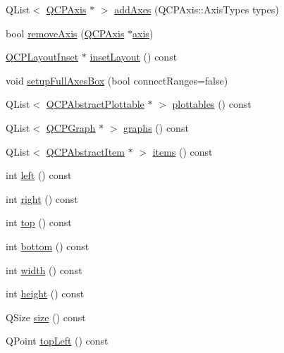 \begin{DoxyCompactItemize}
\item 
Q\+List$<$ \hyperlink{class_q_c_p_axis}{Q\+C\+P\+Axis} $\ast$ $>$ \hyperlink{class_q_c_p_axis_rect_a792e1f3d9cb1591fca135bb0de9b81fc}{add\+Axes} (Q\+C\+P\+Axis\+::\+Axis\+Types types)
\item 
bool \hyperlink{class_q_c_p_axis_rect_a03c39cd9704f0d36fb6cf980cdddcbaa}{remove\+Axis} (\hyperlink{class_q_c_p_axis}{Q\+C\+P\+Axis} $\ast$\hyperlink{class_q_c_p_axis_rect_a560de44e47a4af0f86c59102a094b1e4}{axis})
\item 
\hyperlink{class_q_c_p_layout_inset}{Q\+C\+P\+Layout\+Inset} $\ast$ \hyperlink{class_q_c_p_axis_rect_a4114887c7141b59650b7488f930993e5}{inset\+Layout} () const 
\item 
void \hyperlink{class_q_c_p_axis_rect_a5fa906175447b14206954f77fc7f1ef4}{setup\+Full\+Axes\+Box} (bool connect\+Ranges=false)
\item 
Q\+List$<$ \hyperlink{class_q_c_p_abstract_plottable}{Q\+C\+P\+Abstract\+Plottable} $\ast$ $>$ \hyperlink{class_q_c_p_axis_rect_a5b0d629c8de5572945eeae79a142296e}{plottables} () const 
\item 
Q\+List$<$ \hyperlink{class_q_c_p_graph}{Q\+C\+P\+Graph} $\ast$ $>$ \hyperlink{class_q_c_p_axis_rect_afa4ff90901d9275f670e24b40e3c1b25}{graphs} () const 
\item 
Q\+List$<$ \hyperlink{class_q_c_p_abstract_item}{Q\+C\+P\+Abstract\+Item} $\ast$ $>$ \hyperlink{class_q_c_p_axis_rect_a0f17ed539962cfcbaca8ce0b1776c840}{items} () const 
\item 
int \hyperlink{class_q_c_p_axis_rect_a55b3ecf72a3a65b053f7651b88db458d}{left} () const 
\item 
int \hyperlink{class_q_c_p_axis_rect_a6d0f989fc552aa2b563cf82f8fc81e61}{right} () const 
\item 
int \hyperlink{class_q_c_p_axis_rect_ac45aef1eb75cea46b241b6303028a607}{top} () const 
\item 
int \hyperlink{class_q_c_p_axis_rect_af2b5982ebe7e6f781b9bf1cc371a60d8}{bottom} () const 
\item 
int \hyperlink{class_q_c_p_axis_rect_a45bf5c17f4ca29131b7eb0db06efc259}{width} () const 
\item 
int \hyperlink{class_q_c_p_axis_rect_a1c55c4f3bef40cf01b21820316c8469e}{height} () const 
\item 
Q\+Size \hyperlink{class_q_c_p_axis_rect_a871b9fe49e92b39a3cbe29a59e458536}{size} () const 
\item 
Q\+Point \hyperlink{class_q_c_p_axis_rect_a88acbe716bcf5072790a6f95637c40d8}{top\+Left} () const 

\end{DoxyCompactItemize}
